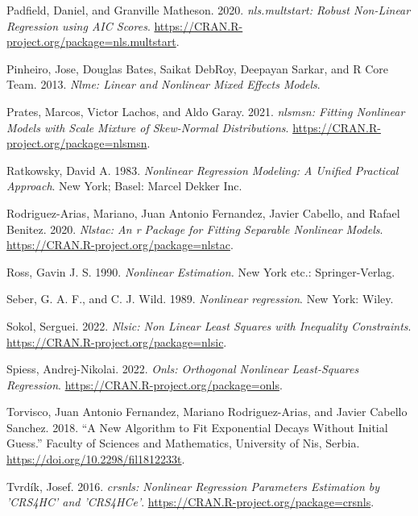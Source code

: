 \begin{CSLReferences}{1}{0}
\leavevmode{}%
Padfield, Daniel, and Granville Matheson. 2020. \emph{{nls.multstart: Robust Non-Linear Regression using AIC Scores}}. \url{https://CRAN.R-project.org/package=nls.multstart}.

\leavevmode{}%
Pinheiro, Jose, Douglas Bates, Saikat DebRoy, Deepayan Sarkar, and R Core Team. 2013. \emph{Nlme: Linear and Nonlinear Mixed Effects Models}.

\leavevmode{}%
Prates, Marcos, Victor Lachos, and Aldo Garay. 2021. \emph{{nlsmsn: Fitting Nonlinear Models with Scale Mixture of Skew-Normal Distributions}}. \url{https://CRAN.R-project.org/package=nlsmsn}.

\leavevmode{}%
Ratkowsky, David A. 1983. \emph{Nonlinear Regression Modeling: A Unified Practical Approach}. New York; Basel: Marcel Dekker Inc.

\leavevmode{}%
Rodriguez-Arias, Mariano, Juan Antonio Fernandez, Javier Cabello, and Rafael Benitez. 2020. \emph{Nlstac: An r Package for Fitting Separable Nonlinear Models}. \url{https://CRAN.R-project.org/package=nlstac}.

\leavevmode{}%
Ross, Gavin J. S. 1990. \emph{Nonlinear Estimation.} New York etc.: Springer-Verlag.

\leavevmode{}%
Seber, G. A. F., and C. J. Wild. 1989. \emph{{Nonlinear regression}}. New York: Wiley.

\leavevmode{}%
Sokol, Serguei. 2022. \emph{Nlsic: Non Linear Least Squares with Inequality Constraints}. \url{https://CRAN.R-project.org/package=nlsic}.

\leavevmode{}%
Spiess, Andrej-Nikolai. 2022. \emph{Onls: Orthogonal Nonlinear Least-Squares Regression}. \url{https://CRAN.R-project.org/package=onls}.

\leavevmode{}%
Torvisco, Juan Antonio Fernandez, Mariano Rodriguez-Arias, and Javier Cabello Sanchez. 2018. {``A New Algorithm to Fit Exponential Decays Without Initial Guess.''} {Faculty of Sciences and Mathematics, University of Nis, Serbia}. \url{https://doi.org/10.2298/fil1812233t}.

\leavevmode{}%
Tvrdík, Josef. 2016. \emph{{crsnls: Nonlinear Regression Parameters Estimation by 'CRS4HC' and 'CRS4HCe'}}. \url{https://CRAN.R-project.org/package=crsnls}.


\end{CSLReferences}
